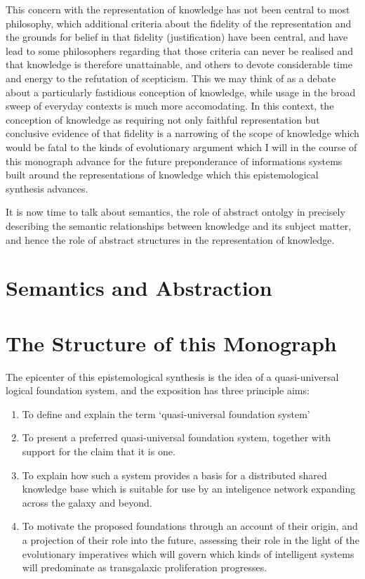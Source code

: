 This concern with the representation of knowledge has not been central to most philosophy, which additional criteria about the fidelity of the representation and the grounds for belief in that fidelity (justification) have been central, and have lead to some philosophers regarding that those criteria can never be realised and that knowledge is therefore unattainable, and others to devote considerable time and energy to the refutation of scepticism.
This we may think of as a debate about a particularly fastidious conception of knowledge, while usage in the broad sweep of everyday contexts is much more accomodating.
In this context, the conception of knowledge as requiring not only faithful representation but conclusive evidence of that fidelity is a narrowing of the scope of knowledge which would be fatal to the kinds of evolutionary argument which I will in the course of this monograph advance for the future preponderance of informations systems built around the representations of knowledge which this epistemological synthesis advances.

It is now time to talk about semantics, the role of abstract ontolgy in precisely describing the semantic relationships between knowledge and its subject matter, and hence the role of abstract structures in the representation of knowledge.

\section{Semantics and Abstraction}

\section{The Structure of this Monograph}

The epicenter of this epistemological synthesis is the idea of a quasi-universal logical foundation system, and the exposition has three principle aims:
\begin{enumerate}
\item To define and explain the term `quasi-universal foundation system'
\item To present a preferred quasi-universal foundation system, together with support for the claim that it is one.
\item To explain how such a system provides a basis for a distributed shared knowledge base which is suitable for use by an inteligence network expanding across the galaxy and beyond.
\item To motivate the proposed foundations through an account of their origin, and a projection of their role into the future, assessing their role in the light of the evolutionary imperatives which will govern which kinds of intelligent systems will predominate as transgalaxic proliferation progresses.
  \end{enumerate}
  
